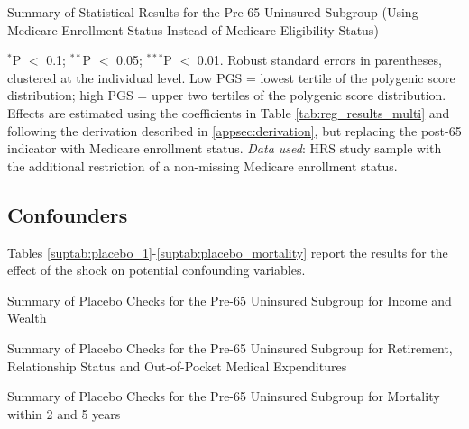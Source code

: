 \begin{table}[!ht] \centering
	\caption{Summary of Statistical Results for the Pre-65 Uninsured Subgroup (Using Medicare Enrollment Status Instead of Medicare Eligibility Status)}
	\label{suptab:main_effects_medicare}

		\begin{flushleft}
			$^{*}$P $<$ 0.1; $^{**}$P $<$ 0.05; $^{***}$P $<$ 0.01. Robust standard errors in parentheses, clustered at the individual level.
			Low PGS = lowest tertile of the polygenic score distribution; high PGS = upper two tertiles of the polygenic score distribution.
			Effects are estimated using the coefficients in Table \ref{tab:reg_results_multi} and following the derivation described in \ref{appsec:derivation}, but replacing the post-65 indicator with Medicare enrollment status.
			\textit{Data used}: HRS study sample with the additional restriction of a non-missing Medicare enrollment status.
		\end{flushleft}

\end{table}


\subsection{Confounders} \label{appsec:confounders}
Tables \ref{suptab:placebo_1}-\ref{suptab:placebo_mortality} report the results for the effect of the shock on potential confounding variables.

\begin{table} \centering
	\caption{Summary of Placebo Checks for the Pre-65 Uninsured Subgroup for Income and Wealth}
	\label{suptab:placebo_1}
	\resizebox{\textwidth}{!}{
	}
\end{table}

\begin{table} \centering
	\caption{Summary of Placebo Checks for the Pre-65 Uninsured Subgroup for Retirement, Relationship Status and Out-of-Pocket Medical Expenditures}
	\label{suptab:placebo_2}
	\resizebox{\textwidth}{!}{
		}
\end{table}

\begin{table} \centering
	\caption{Summary of Placebo Checks for the Pre-65 Uninsured Subgroup for Mortality within 2 and 5 years}
	\label{suptab:placebo_mortality}
	\resizebox{\textwidth}{!}{
		}
\end{table}
